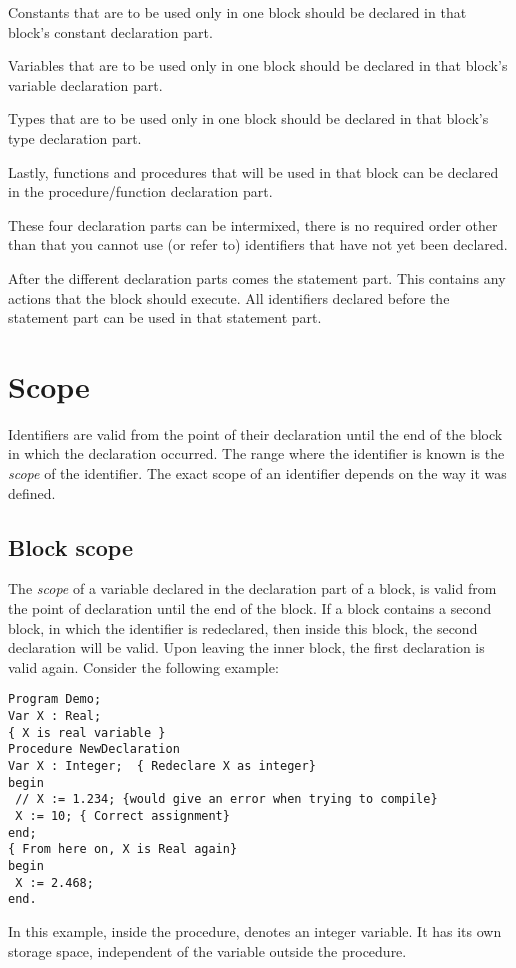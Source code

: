 Constants that are to be used only in one block should be declared in that
block's constant declaration part.

Variables that are to be used only in one block should be declared in that
block's variable declaration part.

Types that are to be used only in one block should be declared in that
block's type declaration part.

Lastly, functions and procedures that will be used in that block can be
declared in the procedure/function declaration part.

These four declaration parts can be intermixed, there is no required order
other than that you cannot use (or refer to) identifiers that have not
yet been declared.

After the different declaration parts comes the statement part. This
contains any actions that the block should execute. All identifiers
declared before the statement part can be used in that statement part.

\section{Scope}
Identifiers are valid from the point of their declaration until the end of
the block in which the declaration occurred. The range where the identifier
is known is the {\em scope} of the identifier. The exact scope of an
identifier depends on the way it was defined.
\subsection{Block scope}
The {\em scope} of a variable declared in the declaration part of a block,
is valid from the point of declaration until the end of the block.
If a block contains a second block, in which the identifier is
redeclared, then inside this block, the second declaration will be valid.
Upon leaving the inner block, the first declaration is valid again.
Consider the following example:
\begin{verbatim}
Program Demo;
Var X : Real;
{ X is real variable }
Procedure NewDeclaration
Var X : Integer;  { Redeclare X as integer}
begin
 // X := 1.234; {would give an error when trying to compile}
 X := 10; { Correct assignment}
end;
{ From here on, X is Real again}
begin
 X := 2.468;
end.
\end{verbatim}
In this example, inside the procedure,  denotes an integer variable.
It has its own storage space, independent of the variable  outside
the procedure.


